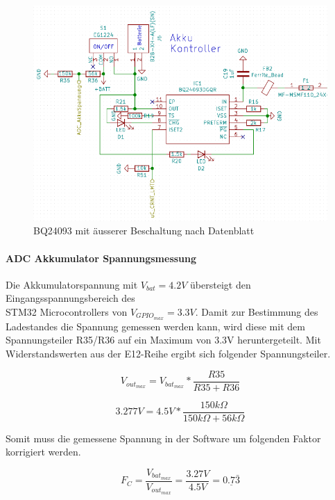 \begin{figure} [H]
\begin{center}
\includegraphics[scale=0.5]{../graphics/Schema_Akku.png}
\caption{BQ24093 mit äusserer Beschaltung nach Datenblatt}
\label{fig:Schema_Akku}
\end{center}
\end{figure}

\paragraph{ADC Akkumulator Spannungsmessung}

Die Akkumulatorspannung mit ${V_{bat}=4.2\si{V}}$ übersteigt den Eingangsspannungsbereich des\\
 STM32 Microcontrollers von ${V_{GPIO_{max}}=3.3\si{V}}$.
Damit zur Bestimmung des Ladestandes die Spannung gemessen werden kann, wird diese mit dem Spannungsteiler R35/R36 auf ein Maximum von 3.3\si{V} heruntergeteilt. 
Mit Widerstandswerten aus der E12-Reihe ergibt sich folgender Spannungsteiler.

\begin{equation}
V_{out_{max}} = V_{bat_{max}}*\frac{R35}{R35+R36}
\end{equation}

\begin{equation}
3.277\si{V} = 4.5\si{V}*\frac{150\si{k\Omega}}{150\si{k\Omega}+56\si{k\Omega}}
\end{equation}

Somit muss die gemessene Spannung in der Software um folgenden Faktor korrigiert werden.

\begin{equation}
F_C=\frac{V_{bat_{max}}}{V_{out_{max}}}=\frac{3.27\si{V}}{4.5\si{V}}=\underline{0.7\bar{3}}
\end{equation}

